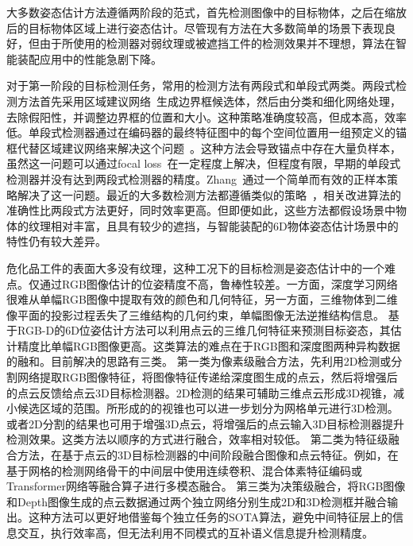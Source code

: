 \documentclass[12pt]{article}
\begin{document}
大多数姿态估计方法遵循两阶段的范式，首先检测图像中的目标物体，之后在缩放后的目标物体区域上进行姿态估计。尽管现有方法在大多数简单的场景下表现良好，但由于所使用的检测器对弱纹理或被遮挡工件的检测效果并不理想，算法在智能装配应用中的性能急剧下降。

对于第一阶段的目标检测任务，常用的检测方法有两段式和单段式两类\cite{ATSS, fcosv1, fcosv2, PAA, faster-rcnn, maskrcnn}。两段式检测方法首先采用区域建议网络~\cite{faster-rcnn, maskrcnn}生成边界框候选体，然后由分类和细化网络处理，去除假阳性，并调整边界框的位置和大小。这种策略准确度较高，但成本高，效率低。单段式检测器通过在编码器的最终特征图中的每个空间位置用一组预定义的锚框代替区域建议网络来解决这个问题~\cite{retinanet,fcosv1,yolov1}。这种方法会导致锚点中存在大量负样本，虽然这一问题可以通过focal loss~\cite{retinanet,fpn}在一定程度上解决，但程度有限，早期的单段式检测器并没有达到两段式检测器的精度。Zhang~\cite{ATSS}通过一个简单而有效的正样本策略解决了这一问题。最近的大多数检测方法都遵循类似的策略~\cite{fcosv2, PAA, autoassign, OTA, TTF, yolov3}，相关改进算法的准确性比两段式方法更好，同时效率更高。但即便如此，这些方法都假设场景中物体的纹理相对丰富，且具有较少的遮挡，与智能装配的6D物体姿态估计场景中的特性仍有较大差异。

危化品工件的表面大多没有纹理，这种工况下的目标检测是姿态估计中的一个难点。仅通过RGB图像估计的位姿精度不高，鲁棒性较差。一方面，深度学习网络很难从单幅RGB图像中提取有效的颜色和几何特征，另一方面，三维物体到二维像平面的投影过程丢失了三维结构的几何约束，单幅图像无法逆推结构信息。
基于RGB-D的6D位姿估计方法可以利用点云的三维几何特征来预测目标姿态，其估计精度比单幅RGB图像更高。这类算法的难点在于RGB图和深度图两种异构数据的融和。目前解决的思路有三类。
第一类为像素级融合方法，先利用2D检测或分割网络提取RGB图像特征，将图像特征传递给深度图生成的点云，然后将增强后的点云反馈给点云3D目标检测器。2D检测的结果可辅助三维点云形成3D视锥\cite{Qi2018}，减小候选区域的范围。所形成的的视锥也可以进一步划分为网格单元\cite{Wang2019}进行3D检测。或者2D分割的结果也可用于增强3D点云\cite{Vora2020}，将增强后的点云输入3D目标检测器提升检测效果。这类方法以顺序的方式进行融合，效率相对较低。
第二类为特征级融合方法，在基于点云的3D目标检测器的中间阶段融合图像和点云特征。例如，在基于网格的检测网络骨干的中间层中使用连续卷积\cite{Liang2018, Liang2019}、混合体素特征编码\cite{Sindagi2019}或Transformer\cite{Zhang2022}网络等融合算子进行多模态融合。
第三类为决策级融合，将RGB图像和Depth图像生成的点云数据通过两个独立网络分别生成2D和3D检测框\cite{Asvadi2018}并融合输出。这种方法可以更好地借鉴每个独立任务的SOTA算法，避免中间特征层上的信息交互，执行效率高，但无法利用不同模式的互补语义信息\cite{Pang2020}提升检测精度。
\end{document}
